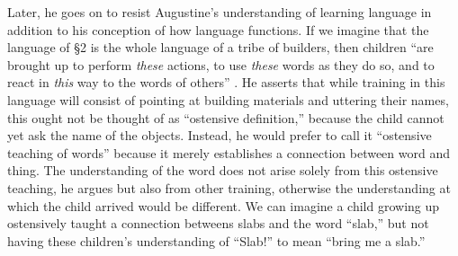 \documentclass[man,12pt,natbib]{apa6}
\begin{document}
Later, he goes on to resist Augustine's understanding of learning language 
in addition to his conception of how language functions. If we imagine that the
language of \S 2 is the whole language of a tribe of builders, then children
``are brought up to perform \emph{these} actions, to use \emph{these} words
as they do so, and to react in \emph{this} way to the words of others''
\citep[\S 6]{Wittgenstein53}. He asserts that while training in this language
will consist of pointing at building materials and uttering their names, this
ought not be thought of as ``ostensive definition,'' because the child cannot
yet ask the name of the objects. Instead, he would prefer to call it
``ostensive teaching of words'' because it merely establishes a connection
between word and thing. The understanding of the word does not arise solely
from this ostensive teaching, he argues but also from other training, otherwise
the understanding at which the child arrived would be different. We can imagine
a child growing up ostensively taught a connection betweens slabs and the word
``slab,'' but not having these children's understanding of ``Slab!'' to
mean ``bring me a slab.''
\end{document}
